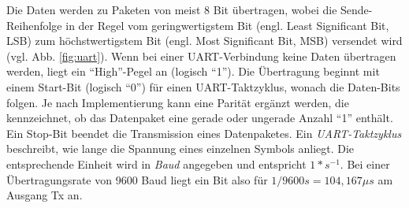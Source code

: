 Die Daten werden zu Paketen von meist 8 Bit übertragen, wobei die Sende-Reihenfolge in der Regel vom geringwertigstem Bit (engl. Least Significant Bit, LSB) zum höchstwertigstem Bit (engl. Most Significant Bit, MSB) versendet wird (vgl. Abb. \ref{fig:uart}). Wenn bei einer UART-Verbindung keine Daten übertragen werden, liegt ein ``High''-Pegel an (logisch ``1''). Die Übertragung beginnt mit einem Start-Bit (logisch ``0'') für einen UART-Taktzyklus, wonach die Daten-Bits folgen. Je nach Implementierung kann eine Parität ergänzt werden, die kennzeichnet, ob das Datenpaket eine gerade oder ungerade Anzahl ``1'' enthält. Ein Stop-Bit beendet die Transmission eines Datenpaketes. Ein \textit{UART-Taktzyklus} beschreibt, wie lange die Spannung eines einzelnen Symbols anliegt. Die entsprechende Einheit wird in \textit{Baud} angegeben und entspricht $1 * s^{-1}$. Bei einer Übertragungsrate von 9600 Baud liegt ein Bit also für $1 / 9600s = 104,167 \mu s$ am Ausgang Tx an.


